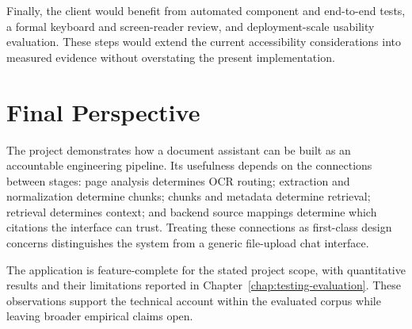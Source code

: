 Finally, the client would benefit from automated component and end-to-end tests, a formal keyboard and screen-reader review, and deployment-scale usability evaluation. These steps would extend the current accessibility considerations into measured evidence without overstating the present implementation.

\section{Final Perspective}

The project demonstrates how a document assistant can be built as an accountable engineering pipeline. Its usefulness depends on the connections between stages: page analysis determines OCR routing; extraction and normalization determine chunks; chunks and metadata determine retrieval; retrieval determines context; and backend source mappings determine which citations the interface can trust. Treating these connections as first-class design concerns distinguishes the system from a generic file-upload chat interface.

The application is feature-complete for the stated project scope, with quantitative results and their limitations reported in Chapter~\ref{chap:testing-evaluation}. These observations support the technical account within the evaluated corpus while leaving broader empirical claims open.
